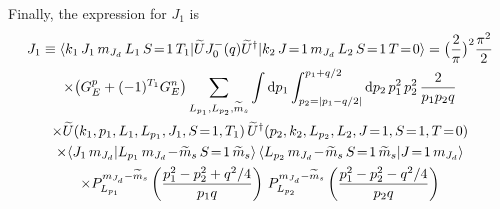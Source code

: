   Finally, the expression for $J_1$ is
  \begin{multline}
    J_1 \equiv \mbraket{{\thickmuskip=0mu k_1 \, J_1 \, \mJd \,
    L_1 \, S\!=\!1 \, T_1}}
    {\wt{U} J_0^-(q) \wt{U}^\dag}{{\thickmuskip=0mu k_2 \, J\!=\!1 \,
    \mJd \, L_2 \, S\!=\!1 \,
    T\!=\!0}} = \big(\frac{2}{\pi}\big)^2 \frac{\pi^2}{2} \\
    \times
    \big(G_E^p + (-1)^{T_1} G_E^n \big)
    \sum_{L_{p_1}, L_{p_2}, \mst}
    \int \dd p_1 \int_{p_2 = |p_1 - q/2|}^{p_1 + q/2} \dd p_2 \, p_1^2
    \, p_2^2 \, \frac{2}{p_1 p_2 q} \\
    \times \wt{U}({\thickmuskip=0mu k_1, p_1, L_1, L_{p_1}, J_1, S\!=\!1,
      T_1}) \, \wt{U}^\dag({\thickmuskip=0mu p_2, k_2, L_{p_2}, L_2, J\!=\!1,
      S\!=\!1, T\!=\!0}) \\
    \times \braket{J_1 \, \mJd}{L_{p_1} \, \mJd \!- \!\mst \, {S\!=\!1}
      \, \mst} \, \CG{L_{p_2}}{\mJd\!-\!\mst}{S\!=\!1}{\mst}{J\!=\!1}{\mJd} \\
    \times P_{L_{p_1}}^{\mJd - \mst}\left(\frac{p_1^2 - p_2^2 + q^2/4}{p_1 q}
      \right) \,
      P_{L_{p_2}}^{\mJd - \mst}\left(
      \frac{p_1^2 -p_2^2 - q^2/4}{p_2 q}
      \right)
  \end{multline}
